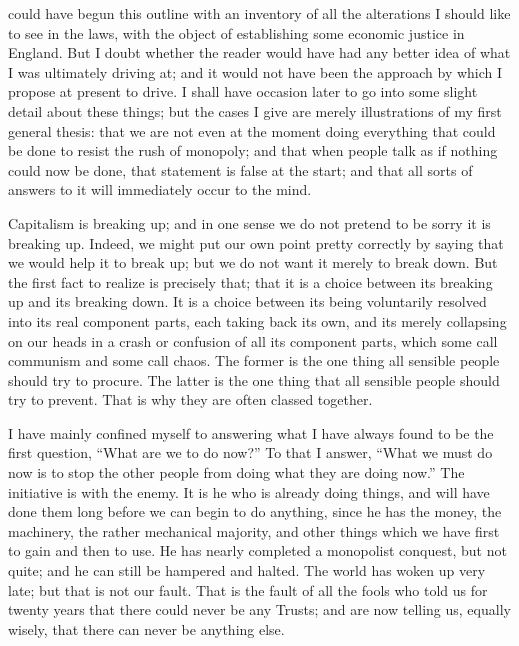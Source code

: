\documentclass{book}
\begin{document}
could have begun this outline with an inventory of all the alterations I should like to see in the laws, with the object of establishing some economic justice in England. But I doubt whether the reader would have had any better idea of what I was ultimately driving at; and it would not have been the approach by which I propose at present to drive. I shall have occasion later to go into some slight detail about these things; but the cases I give are merely illustrations of my first general thesis: that we are not even at the moment doing everything that could be done to resist the rush of monopoly; and that when people talk as if nothing could now be done, that statement is false at the start; and that all sorts of answers to it will immediately occur to the mind.

Capitalism is breaking up; and in one sense we do not pretend to be sorry it is breaking up. Indeed, we might put our own point pretty correctly by saying that we would help it to break up; but we do not want it merely to break down. But the first fact to realize is precisely that; that it is a choice between its breaking up and its breaking down. It is a choice between its being voluntarily resolved into its real component parts, each taking back its own, and its merely collapsing on our heads in a crash or confusion of all its component parts, which some call communism and some call chaos. The former is the one thing all sensible people should try to procure. The latter is the one thing that all sensible people should try to prevent. That is why they are often classed together.

I have mainly confined myself to answering what I have always found to be the first question, “What are we to do now?” To that I answer, “What we must do now is to stop the other people from doing what they are doing now.” The initiative is with the enemy. It is he who is already doing things, and will have done them long before we can begin to do anything, since he has the money, the machinery, the rather mechanical majority, and other things which we have first to gain and then to use. He has nearly completed a monopolist conquest, but not quite; and he can still be hampered and halted. The world has woken up very late; but that is not our fault. That is the fault of all the fools who told us for twenty years that there could never be any Trusts; and are now telling us, equally wisely, that there can never be anything else.
\end{document}
